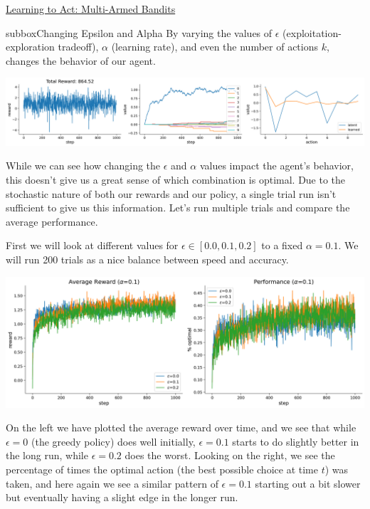 \begin{textbox}{\href{https://compneuro.neuromatch.io/tutorials/W3D4_ReinforcementLearning/student/W3D4_Tutorial2.html}{Learning to Act: Multi-Armed Bandits } }

\begin{subbox}{subbox}{Changing Epsilon and Alpha}
\scriptsize
By varying the values of $\epsilon$ (exploitation-exploration tradeoff), $\alpha$ (learning rate), and even the number of actions $k$, changes the behavior of our agent.


\begin{center}
    
\includegraphics[scale=0.13]{Figures/RL/RL_Figure11.png}
\end{center}

While we can see how changing the $\epsilon$ and $\alpha$ values impact the agent's behavior, this doesn't give us a great sense of which combination is optimal. Due to the stochastic nature of both our rewards and our policy, a single trial run isn't sufficient to give us this information. Let's run multiple trials and compare the average performance.

First we will look at different values for $\epsilon \in [0.0, 0.1, 0.2]$ to a fixed $\alpha=0.1$. We will run 200 trials as a nice balance between speed and accuracy.

\begin{center}
    
\includegraphics[scale=0.15]{Figures/RL/RL_Figure12.png}
\end{center}
On the left we have plotted the average reward over time, and we see that while $\epsilon=0$ (the greedy policy) does well initially, $\epsilon=0.1$ starts to do slightly better in the long run, while $\epsilon=0.2$ does the worst. Looking on the right, we see the percentage of times the optimal action (the best possible choice at time $t$) was taken, and here again we see a similar pattern of $\epsilon=0.1$ starting out a bit slower but eventually having a slight edge in the longer run.


\end{subbox}
\end{textbox}
